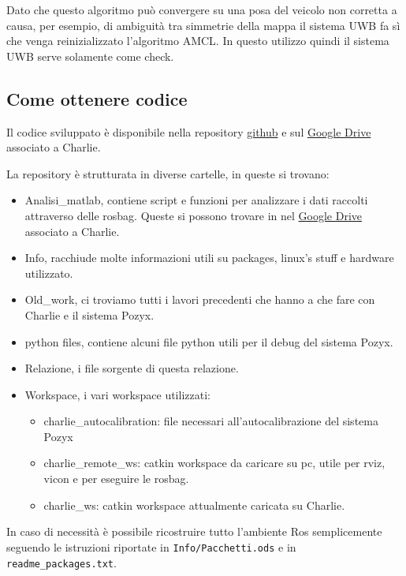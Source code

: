 Dato che questo algoritmo può convergere su una posa del veicolo non corretta a causa, per esempio, di ambiguità  tra simmetrie della mappa 
il sistema UWB fa sì che venga reinizializzato l'algoritmo AMCL. 
In questo utilizzo quindi il sistema UWB serve solamente come check.

\subsection*{Come ottenere codice}
Il codice sviluppato è disponibile nella repository \href{https://github.com/ABiondi12/project_sgn}{github} e sul
\href{https://drive.google.com/drive/folders/1rXppVs0qSfeEKQumRFrPhkpiYDCvTXOL?usp=sharing}{Google Drive} associato a Charlie. 

La repository \`e strutturata in diverse cartelle, in queste si trovano:
\begin{itemize}
	\item Analisi\_matlab, contiene script e funzioni per analizzare i dati raccolti attraverso delle rosbag. Queste si possono trovare in nel
	\href{https://drive.google.com/drive/folders/1rXppVs0qSfeEKQumRFrPhkpiYDCvTXOL?usp=sharing}{Google Drive} associato a Charlie. 
	
	\item Info, racchiude molte informazioni utili su packages, linux's stuff e hardware utilizzato.

	\item Old\_work, ci troviamo tutti i lavori precedenti che hanno a che fare con Charlie e il sistema Pozyx. 

	\item python files, contiene alcuni file python utili per il debug del sistema Pozyx.

	\item Relazione, i file sorgente di questa relazione.
	
	\item Workspace, i vari workspace utilizzati:
		\begin{itemize}
			\item charlie\_autocalibration: file necessari all'autocalibrazione del sistema Pozyx

			\item charlie\_remote\_ws: catkin workspace da caricare su pc, utile per rviz, vicon e per eseguire le rosbag.
			
			\item charlie\_ws: catkin workspace attualmente caricata su Charlie.
			
		\end{itemize}

\end{itemize}
In caso di necessit\`a \`e possibile ricostruire tutto l'ambiente Ros semplicemente seguendo le istruzioni riportate in \verb|Info/|\verb|Pacchetti.ods| 
e in \verb|readme_packages.txt|.



